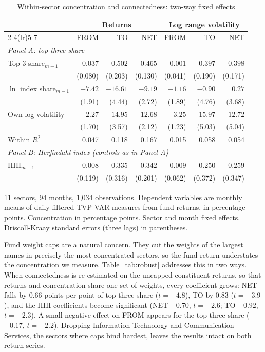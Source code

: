 \documentclass[11pt]{article}
\begin{document}
\begin{table}[H]
\centering
\caption{Within-sector concentration and connectedness: two-way fixed effects}
\label{tab:panel}
\small
\begin{tabular}{lrrrrrr}
\toprule
& \multicolumn{3}{c}{Returns} & \multicolumn{3}{c}{Log range volatility} \\
\cmidrule(lr){2-4}\cmidrule(lr){5-7}
& FROM & TO & NET & FROM & TO & NET \\
\midrule
\multicolumn{7}{l}{\textit{Panel A: top-three share}} \\
Top-3 share$_{m-1}$ & $-0.037$ & $-0.502$ & $-0.465$ & $0.001$ & $-0.397$ & $-0.398$ \\
& (0.080) & (0.203) & (0.130) & (0.041) & (0.190) & (0.171) \\
$\ln$ index share$_{m-1}$ & $-7.42$ & $-16.61$ & $-9.19$ & $-1.16$ & $-0.90$ & $0.27$ \\
& (1.91) & (4.44) & (2.72) & (1.89) & (4.76) & (3.68) \\
Own log volatility & $-2.27$ & $-14.95$ & $-12.68$ & $-3.25$ & $-15.97$ & $-12.72$ \\
& (1.70) & (3.57) & (2.12) & (1.23) & (5.03) & (5.04) \\
Within $R^2$ & 0.047 & 0.118 & 0.167 & 0.015 & 0.058 & 0.054 \\
\midrule
\multicolumn{7}{l}{\textit{Panel B: Herfindahl index (controls as in Panel A)}} \\
HHI$_{m-1}$ & $0.008$ & $-0.335$ & $-0.342$ & $0.009$ & $-0.250$ & $-0.259$ \\
& (0.119) & (0.316) & (0.201) & (0.062) & (0.372) & (0.347) \\
\bottomrule
\end{tabular}

\smallskip
\parbox{0.95\textwidth}{\footnotesize 11 sectors, 94 months, 1,034 observations. Dependent variables are monthly means of daily filtered TVP-VAR measures from fund returns, in percentage points. Concentration in percentage points. Sector and month fixed effects. Driscoll-Kraay standard errors (three lags) in parentheses.}
\end{table}

Fund weight caps are a natural concern. They cut the weights of the largest names in precisely the most concentrated sectors, so the fund return understates the concentration we measure. Table~\ref{tab:robust} addresses this in two ways. When connectedness is re-estimated on the uncapped constituent returns, so that returns and concentration share one set of weights, every coefficient grows: NET falls by 0.66 points per point of top-three share ($t=-4.8$), TO by 0.83 ($t=-3.9$), and the HHI coefficients become significant (NET $-0.70$, $t=-2.6$; TO $-0.92$, $t=-2.3$). A small negative effect on FROM appears for the top-three share ($-0.17$, $t=-2.2$). Dropping Information Technology and Communication Services, the sectors where caps bind hardest, leaves the results intact on both return series.
\end{document}
